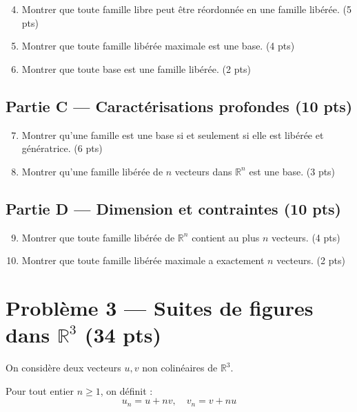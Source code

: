 \documentclass[11pt,a4paper]{article}
\begin{document}
\begin{enumerate}
\setcounter{enumi}{3}
\item Montrer que toute famille libre peut être réordonnée en une famille libérée. \hfill (5 pts)
\item Montrer que toute famille libérée maximale est une base. \hfill (4 pts)
\item Montrer que toute base est une famille libérée. \hfill (2 pts)
\end{enumerate}

\subsection*{Partie C — Caractérisations profondes (10 pts)}

\begin{enumerate}
\setcounter{enumi}{6}
\item Montrer qu’une famille est une base si et seulement si elle est libérée et génératrice. \hfill (6 pts)
\item Montrer qu’une famille libérée de $n$ vecteurs dans $\mathbb{R}^n$ est une base. \hfill (3 pts)
\end{enumerate}

\subsection*{Partie D — Dimension et contraintes (10 pts)}

\begin{enumerate}
\setcounter{enumi}{8}
\item Montrer que toute famille libérée de $\mathbb{R}^n$ contient au plus $n$ vecteurs. \hfill (4 pts)
\item Montrer que toute famille libérée maximale a exactement $n$ vecteurs. \hfill (2 pts)
\end{enumerate}

\newpage
\section*{Problème 3 — Suites de figures dans $\mathbb{R}^3$ (34 pts)}

On considère deux vecteurs $u,v$ non colinéaires de $\mathbb{R}^3$.

Pour tout entier $n \geq 1$, on définit :
\[
u_n = u + n v, \quad v_n = v + n u
\]
\end{document}
